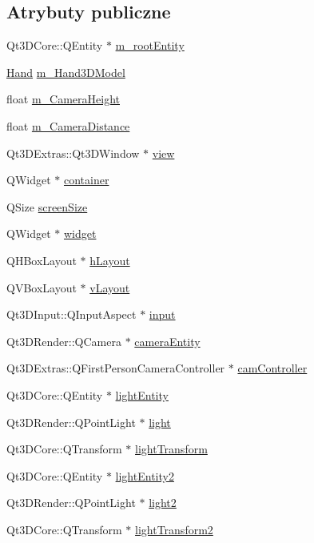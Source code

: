 \subsection*{Atrybuty publiczne}
\begin{DoxyCompactItemize}
\item 
Qt3\+D\+Core\+::\+Q\+Entity $\ast$ \hyperlink{class_scene_a1ef7f61aed73e150dfb7ef7ffc47f7c2}{m\+\_\+root\+Entity}
\item 
\hyperlink{class_hand}{Hand} \hyperlink{class_scene_adf272488e380e731a1c20fa5cd208490}{m\+\_\+\+Hand3\+D\+Model}
\item 
float \hyperlink{class_scene_af3aa76a49254de3b2ee5991677942ba3}{m\+\_\+\+Camera\+Height}
\item 
float \hyperlink{class_scene_a8f666aa1574fd1a1ecae97fa55ad2be8}{m\+\_\+\+Camera\+Distance}
\item 
Qt3\+D\+Extras\+::\+Qt3\+D\+Window $\ast$ \hyperlink{class_scene_a3b76fefe111a22aa56f066783fa76bc1}{view}
\item 
Q\+Widget $\ast$ \hyperlink{class_scene_a10832d33619bdb86c51bb75377ea649d}{container}
\item 
Q\+Size \hyperlink{class_scene_a2bb58c1253bd4d64781a2b9e25604060}{screen\+Size}
\item 
Q\+Widget $\ast$ \hyperlink{class_scene_aa6f9d0915a83b6d5e5083c439627ff06}{widget}
\item 
Q\+H\+Box\+Layout $\ast$ \hyperlink{class_scene_a285ea7ad07d9419d79fccbde3a9f8388}{h\+Layout}
\item 
Q\+V\+Box\+Layout $\ast$ \hyperlink{class_scene_adae30f81725ed3f2258bee8fe5e90c5d}{v\+Layout}
\item 
Qt3\+D\+Input\+::\+Q\+Input\+Aspect $\ast$ \hyperlink{class_scene_aa17e5d3b3393d6ea4cbbf7ab981b5b62}{input}
\item 
Qt3\+D\+Render\+::\+Q\+Camera $\ast$ \hyperlink{class_scene_aed08c4ba793fa5d32104d47c9cfd2c5c}{camera\+Entity}
\item 
Qt3\+D\+Extras\+::\+Q\+First\+Person\+Camera\+Controller $\ast$ \hyperlink{class_scene_a55d0f4c21e5ac40b4ad53a67bf851ff7}{cam\+Controller}
\item 
Qt3\+D\+Core\+::\+Q\+Entity $\ast$ \hyperlink{class_scene_a932f32946da0283ac184a28cb13f4427}{light\+Entity}
\item 
Qt3\+D\+Render\+::\+Q\+Point\+Light $\ast$ \hyperlink{class_scene_ac2f294ceccf5b708d6dcdd540e51d787}{light}
\item 
Qt3\+D\+Core\+::\+Q\+Transform $\ast$ \hyperlink{class_scene_a24f2698364e45c011a80c51747a62bae}{light\+Transform}
\item 
Qt3\+D\+Core\+::\+Q\+Entity $\ast$ \hyperlink{class_scene_a9ad241dc981470f63bb5d7a5bd25888e}{light\+Entity2}
\item 
Qt3\+D\+Render\+::\+Q\+Point\+Light $\ast$ \hyperlink{class_scene_a7a9feb72cc710357f6166f5ec45369cd}{light2}
\item 
Qt3\+D\+Core\+::\+Q\+Transform $\ast$ \hyperlink{class_scene_af5b3d0a98c256da599ddd8973016b10b}{light\+Transform2}
\end{DoxyCompactItemize}


